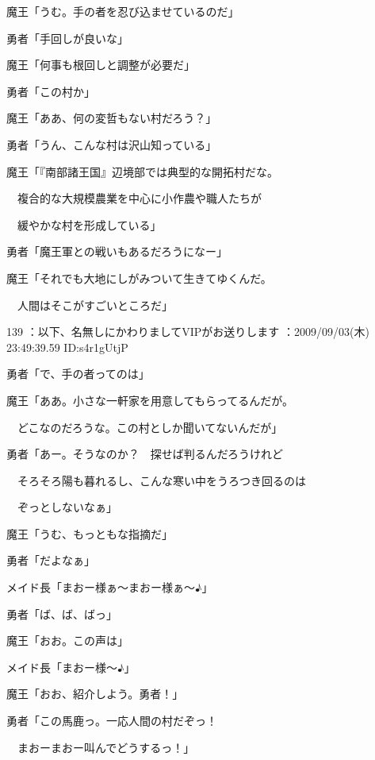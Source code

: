 \documentclass[a4j,twocolumn]{tarticle}
\begin{document}
魔王「うむ。手の者を忍び込ませているのだ」\par{} 
勇者「手回しが良いな」\par{} 
魔王「何事も根回しと調整が必要だ」 



勇者「この村か」\par{} 
魔王「ああ、何の変哲もない村だろう？」 



勇者「うん、こんな村は沢山知っている」\par{} 
魔王「『南部諸王国』辺境部では典型的な開拓村だな。\par{} 
　複合的な大規模農業を中心に小作農や職人たちが\par{} 
　緩やかな村を形成している」 



勇者「魔王軍との戦いもあるだろうになー」\par{} 
魔王「それでも大地にしがみついて生きてゆくんだ。\par{} 
　人間はそこがすごいところだ」

	
    
    

139 ：以下、名無しにかわりましてVIPがお送りします ：2009/09/03(木) 23:49:39.59 ID:s4r1gUtjP 


勇者「で、手の者ってのは」\par{} 
魔王「ああ。小さな一軒家を用意してもらってるんだが。\par{} 
　どこなのだろうな。この村としか聞いてないんだが」 



勇者「あー。そうなのか？　探せば判るんだろうけれど\par{} 
　そろそろ陽も暮れるし、こんな寒い中をうろつき回るのは\par{} 
　ぞっとしないなぁ」 



魔王「うむ、もっともな指摘だ」\par{} 
勇者「だよなぁ」 



メイド長「まおー様ぁ～まおー様ぁ～♪」\par{} 
勇者「ば、ば、ばっ」 



魔王「おお。この声は」\par{} 
メイド長「まおー様～♪」 



魔王「おお、紹介しよう。勇者！」\par{} 
勇者「この馬鹿っ。一応人間の村だぞっ！ \par{}
　まおーまおー叫んでどうするっ！」 
\end{document}
